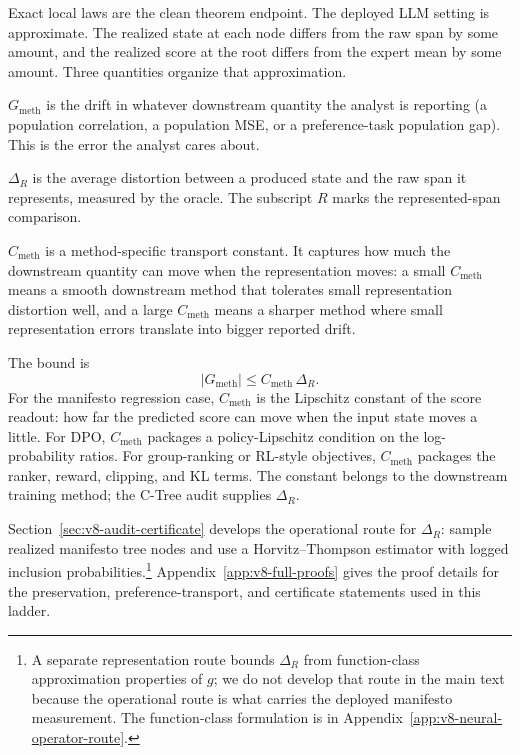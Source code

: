 Exact local laws are the clean theorem endpoint. The deployed LLM
setting is approximate. The realized state at each node differs from
the raw span by some amount, and the realized score at the root
differs from the expert mean by some amount. Three quantities organize
that approximation.

\(G_{\mathrm{meth}}\) is the drift in whatever downstream quantity the
analyst is reporting (a population correlation, a population MSE, or a
preference-task population gap). This is the error the analyst cares
about.

\(\Delta_R\) is the average distortion between a produced state and
the raw span it represents, measured by the oracle. The subscript
\(R\) marks the represented-span comparison.

\(C_{\mathrm{meth}}\) is a method-specific transport constant. It
captures how much the downstream quantity can move when the
representation moves: a small \(C_{\mathrm{meth}}\) means a smooth
downstream method that tolerates small representation distortion well,
and a large \(C_{\mathrm{meth}}\) means a sharper method where small
representation errors translate into bigger reported drift.

The bound is
\begin{equation}
\label{eq:v8-population-gap}
  |G_{\mathrm{meth}}|
  \le
  C_{\mathrm{meth}}\,\Delta_R .
\end{equation}
For the manifesto regression case, \(C_{\mathrm{meth}}\) is the
Lipschitz constant of the score readout: how far the predicted score
can move when the input state moves a little. For DPO,
\(C_{\mathrm{meth}}\) packages a policy-Lipschitz condition on the
log-probability ratios. For group-ranking or RL-style objectives,
\(C_{\mathrm{meth}}\) packages the ranker, reward, clipping, and KL
terms. The constant belongs to the downstream training method; the
C-Tree audit supplies \(\Delta_R\).

Section~\ref{sec:v8-audit-certificate} develops the operational route
for \(\Delta_R\): sample realized manifesto tree nodes and use a
Horvitz--Thompson estimator with logged inclusion
probabilities.\footnote{A separate representation route bounds
\(\Delta_R\) from function-class approximation properties of \(g\); we
do not develop that route in the main text because the operational
route is what carries the deployed manifesto measurement. The
function-class formulation is in
Appendix~\ref{app:v8-neural-operator-route}.}
Appendix~\ref{app:v8-full-proofs} gives the proof details for the
preservation, preference-transport, and certificate statements used
in this ladder.

